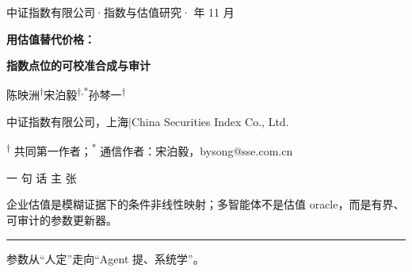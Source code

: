 \documentclass[UTF8,fontset=mac,11pt]{ctexart}
\newcommand{\hei}{\CJKfamily{pf}}
\begin{document}
\fontsize{24}{32.4}\selectfont

\noindent
\begin{minipage}[c][150mm][c]{\textwidth}
\hspace*{26mm}%
\begin{minipage}[c]{400mm}\RaggedRight
{\hei\fontsize{19}{22}\selectfont\color{cream!72!lacquer}中证指数有限公司\quad·\quad 指数与估值研究\quad· 年 11 月}\par\vspace{3mm}
{\hei\bfseries\fontsize{74}{80}\selectfont\color{cream}用估值替代价格：}\par\vspace{0.4mm}
{\hei\bfseries\fontsize{74}{80}\selectfont\color{cream}指数点位的可校准合成与审计}\par\vspace{4.4mm}
{\fontsize{28}{33}\selectfont\color{cream}陈映洲\textsuperscript{†}\quad 宋泊毅\textsuperscript{†,*}\quad 孙棽一\textsuperscript{†}}\par\vspace{2.4mm}
{\fontsize{19.5}{24}\selectfont\color{cream!80!lacquer}中证指数有限公司，上海\quad|\quad China Securities Index Co., Ltd.}\par\vspace{1.4mm}
{\fontsize{17.5}{23}\selectfont\color{cream!80!lacquer}\textsuperscript{†} 共同第一作者；\textsuperscript{*} 通信作者：宋泊毅，bysong@sse.com.cn}
\end{minipage}\hspace*{14mm}%
\begin{minipage}[c]{228mm}\RaggedRight
{\hei\fontsize{14}{17}\selectfont\color{gold}一 句 话 主 张}\par\vspace{2.6mm}
{\fontsize{20}{27}\selectfont\color{cream}企业估值是模糊证据下的条件非线性映射；多智能体不是估值 oracle，而是有界、可审计的参数更新器。}\par\vspace{2.6mm}
{\color{gold!80!cream}\rule{58mm}{0.4mm}}\par\vspace{1.6mm}
{\fontsize{15}{20}\selectfont\color{cream!78!lacquer}参数从“人定”走向“Agent 提、系统学”。}\par
\end{minipage}
\end{minipage}
\end{document}
